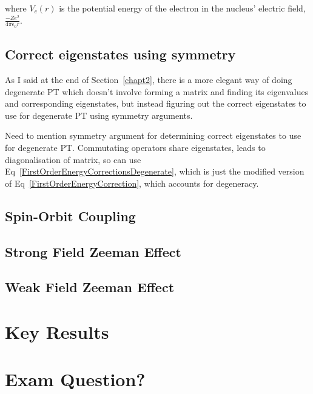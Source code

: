 \noindent where $V_c(r)$ is the potential energy of the electron in the nucleus' electric field, $\frac{-Ze^2}{4\pi\epsilon_0 r}$.

\subsection{Correct eigenstates using symmetry}

As I said at the end of Section~\ref{chapt2}, there is a more elegant way of doing degenerate PT which doesn't involve forming a matrix and finding its eigenvalues and corresponding eigenstates, but instead figuring out the correct eigenstates to use for degenerate PT using symmetry arguments.

\noindent Need to mention symmetry argument for determining correct eigenstates to use for degenerate PT. Commutating operators share eigenstates, leads to diagonalisation of matrix, so can use Eq~\ref{FirstOrderEnergyCorrectionsDegenerate}, which is just the modified version of Eq~\ref{FirstOrderEnergyCorrection}, which accounts for degeneracy.

\subsection{Spin-Orbit Coupling}



\subsection{Strong Field Zeeman Effect}




\subsection{Weak Field Zeeman Effect}




\section{Key Results}





\section{Exam Question?}


